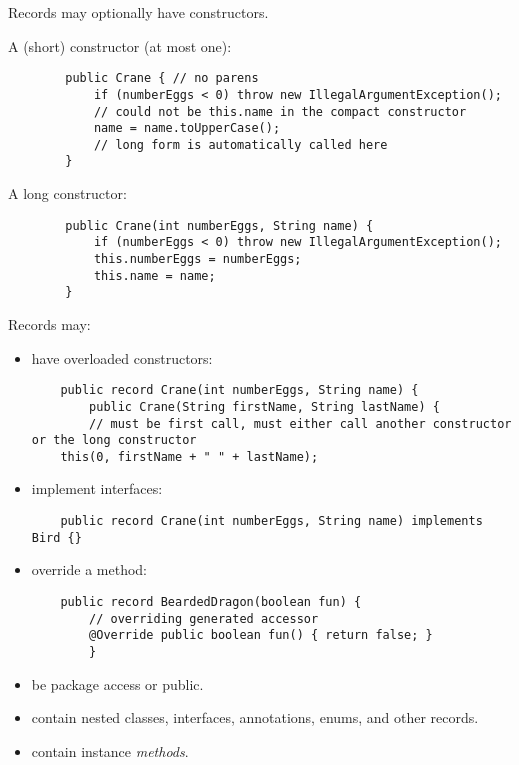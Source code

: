 \documentclass{scrartcl}
\begin{document}
    Records may optionally have constructors.

    A (short) constructor (at most one):

    \begin{lstlisting}
        public Crane { // no parens
            if (numberEggs < 0) throw new IllegalArgumentException();
            // could not be this.name in the compact constructor
            name = name.toUpperCase();
            // long form is automatically called here
        }
    \end{lstlisting}

    A long constructor:

    \begin{lstlisting}
        public Crane(int numberEggs, String name) {
            if (numberEggs < 0) throw new IllegalArgumentException();
            this.numberEggs = numberEggs;
            this.name = name;
        }
    \end{lstlisting}

    Records may:

    \begin{itemize}
    \item have overloaded constructors:
    \begin{lstlisting}
    public record Crane(int numberEggs, String name) {
        public Crane(String firstName, String lastName) {
        // must be first call, must either call another constructor or the long constructor
    this(0, firstName + " " + lastName);
    \end{lstlisting}

    \item implement interfaces:
    \begin{lstlisting}
    public record Crane(int numberEggs, String name) implements Bird {}
    \end{lstlisting}
    \item override a method:
    \begin{lstlisting}
    public record BeardedDragon(boolean fun) {
        // overriding generated accessor
        @Override public boolean fun() { return false; }
        }
    \end{lstlisting}
    \item be package access or public.
    \item contain nested classes, interfaces, annotations, enums, and other records.
    \item contain instance \textit{methods}.
    \end{itemize}
\end{document}
